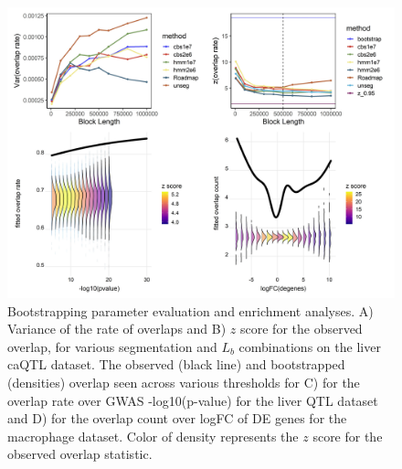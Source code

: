 \begin{figure}[hbtp]
\centering%
\setlength{\abovecaptionskip}{-0.1cm}
\setlength{\belowcaptionskip}{-0.1cm}
\includegraphics[scale=0.25]{Figures/fig2.jpeg}
\caption{
  Bootstrapping parameter evaluation and enrichment analyses. 
  A) Variance of the rate of overlaps and
  B) $z$ score for the observed overlap,
  for various segmentation and $L_b$ combinations on the liver caQTL
  dataset.
  The observed (black line) and bootstrapped (densities) overlap
  seen across various thresholds for
  C) for the overlap rate over GWAS -log10(p-value) for the liver QTL
  dataset and
  D) for the overlap count over logFC of DE genes for the macrophage
  dataset. 
  Color of density represents the $z$ score for the observed overlap
  statistic.
}
\label{fig:result}
\vspace{-0.7cm}
\end{figure}


